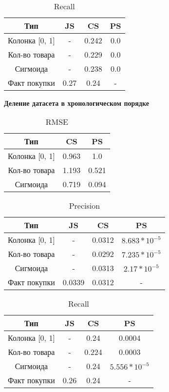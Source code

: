 \begin{table}[H]
  \centering
  \begin{tabular} { | c | c | c | c | }
    \hline
    Тип & JS & CS & PS \\
    \hline
    Колонка [0, 1] & - & 0.242 & 0.0 \\
    \hline
    Кол-во товара & - & 0.229 & 0.0 \\
    \hline
    Сигмоида & - & 0.238 & 0.0 \\
    \hline
    Факт покупки & 0.27 & 0.24 & - \\
    \hline
  \end{tabular}
  \caption{Recall}
\end{table}

\textbf{Деление датасета в хронологическом порядке}

\begin{table}[H]
  \centering
  \begin{tabular} { | c | c | c | }
    \hline
    Тип & CS & PS \\
    \hline
    Колонка [0, 1] & 0.963 & 1.0 \\
    \hline
    Кол-во товара & 1.193 & 0.521 \\
    \hline
    Сигмоида & 0.719 & 0.094 \\
    \hline
  \end{tabular}
  \caption{RMSE}
\end{table}

\begin{table}[H]
  \centering
  \begin{tabular} { | c | c | c | c | }
    \hline
    Тип & JS & CS & PS \\
    \hline
    Колонка [0, 1] & - & 0.0312 & $8.683 * 10^{-5}$ \\
    \hline
    Кол-во товара & - & 0.0292 & $7.235 * 10^{-5}$ \\
    \hline
    Сигмоида & - & 0.0313 & $2.17 * 10^{-5}$ \\
    \hline
    Факт покупки & 0.0339 & 0.0312 & - \\
    \hline
  \end{tabular}
  \caption{Precision}
\end{table}

\begin{table}[H]
  \centering
  \begin{tabular} { | c | c | c | c | }
    \hline
    Тип & JS & CS & PS \\
    \hline
    Колонка [0, 1] & - & 0.24 & 0.0004 \\
    \hline
    Кол-во товара & - & 0.224 & 0.0003\\
    \hline
    Сигмоида & - & 0.24 & $5.556 * 10^{-5}$ \\
    \hline
    Факт покупки & 0.26 & 0.24 & - \\
    \hline
  \end{tabular}
  \caption{Recall}
\end{table}

